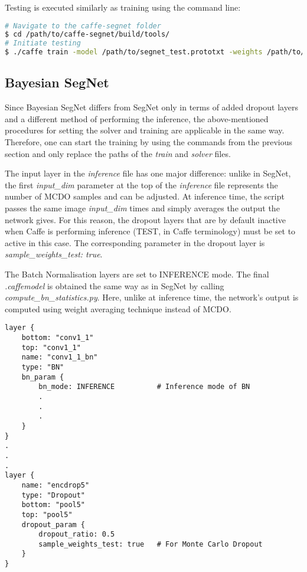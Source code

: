 Testing is executed similarly as training using the command line:

\begin{lstlisting}[language=bash]
# Navigate to the caffe-segnet folder
$ cd /path/to/caffe-segnet/build/tools/
# Initiate testing
$ ./caffe train -model /path/to/segnet_test.prototxt -weights /path/to/final_weights.caffemodel
\end{lstlisting}

\newpage
\subsection{Bayesian SegNet}

Since Bayesian SegNet differs from SegNet only in terms of added dropout layers and a different method of performing the inference, the above-mentioned procedures for setting the solver and training are applicable in the same way. Therefore, one can start the training by using the commands from the previous section and only replace the paths of the \textit{train} and \textit{solver} files. 

The input layer in the \textit{inference} file has one major difference: unlike in SegNet, the first \textit{input\_dim} parameter at the top of the \textit{inference} file represents the number of MCDO samples and can be adjusted. At inference time, the script passes the same image \textit{input\_dim} times and simply averages the output the network gives. For this reason, the dropout layers that are by default inactive when Caffe is performing inference (TEST, in Caffe terminology) must be set to active in this case. The corresponding parameter in the dropout layer is \textit{sample\_weights\_test: true}. 

The Batch Normalisation layers are set to INFERENCE mode. The final \textit{.caffemodel} is obtained the same way as in SegNet by calling \textit{compute\_bn\_statistics.py}. Here, unlike at inference time, the network's output is computed using weight averaging technique instead of MCDO.

\begin{lstlisting}[caption={Setting MCDO in \textit{inference.prototxt}},captionpos=b]
layer {
	bottom: "conv1_1"
	top: "conv1_1"
	name: "conv1_1_bn"
	type: "BN"
	bn_param {
		bn_mode: INFERENCE			# Inference mode of BN
		.
		.
		.
	}
}
.
.
.
layer {
	name: "encdrop5"
	type: "Dropout"
	bottom: "pool5"
	top: "pool5"
	dropout_param {
		dropout_ratio: 0.5
		sample_weights_test: true	# For Monte Carlo Dropout
	}
}
\end{lstlisting}

